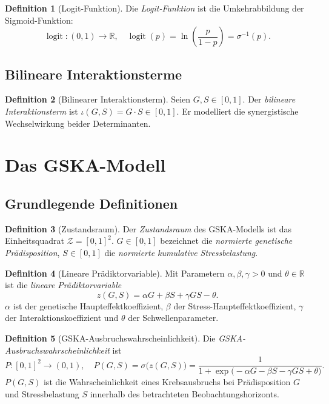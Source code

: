 ﻿\documentclass[12pt, a4paper]{article}
\theoremstyle{definition}
\newtheorem{definition}{Definition}[section]
\theoremstyle{remark}
\DeclareMathOperator{\logit}{logit}
\newcommand{\R}{\mathbb{R}}
\begin{document}
\begin{definition}[Logit-Funktion]
\label{def:logit}
Die \emph{Logit-Funktion} ist die Umkehrabbildung der Sigmoid-Funktion:
\[
  \logit : (0,1) \to \R, \quad \logit(p) = \ln\!\left(\frac{p}{1-p}\right) = \sigma^{-1}(p).
\]
\end{definition}

\subsection{Bilineare Interaktionsterme}

\begin{definition}[Bilinearer Interaktionsterm]
\label{def:bilinear}
Seien $G, S \in [0,1]$. Der \emph{bilineare Interaktionsterm} ist
$\iota(G,S) = G \cdot S \in [0,1]$.
Er modelliert die synergistische Wechselwirkung beider Determinanten.
\end{definition}


\section{Das GSKA-Modell}
\label{sec:modell}


\subsection{Grundlegende Definitionen}

\begin{definition}[Zustandsraum]
\label{def:zustandsraum}
Der \emph{Zustandsraum} des GSKA-Modells ist das Einheitsquadrat
$\mathcal{Z} = [0,1]^2$.
$G \in [0,1]$ bezeichnet die \emph{normierte genetische Prädisposition},
$S \in [0,1]$ die \emph{normierte kumulative Stressbelastung}.
\end{definition}

\begin{definition}[Lineare Prädiktorvariable]
\label{def:praediktor}
Mit Parametern $\alpha, \beta, \gamma > 0$ und $\theta \in \R$ ist die
\emph{lineare Prädiktorvariable}
\[
  z(G,S) = \alpha G + \beta S + \gamma G S - \theta.
\]
$\alpha$ ist der genetische Haupteffektkoeffizient, $\beta$ der
Stress-Haupteffektkoeffizient, $\gamma$ der Interaktionskoeffizient
und $\theta$ der Schwellenparameter.
\end{definition}

\begin{definition}[GSKA-Ausbruchswahrscheinlichkeit]
\label{def:P_GSKA}
Die \emph{GSKA-Ausbruchswahrschein\-lichkeit} ist
\[
  P : [0,1]^2 \to (0,1), \quad P(G,S) = \sigma\!\bigl(z(G,S)\bigr) =
  \frac{1}{1 + \exp\!\bigl(-\alpha G - \beta S - \gamma G S + \theta\bigr)}.
\]
$P(G,S)$ ist die Wahrscheinlichkeit eines Krebsausbruchs bei Prädisposition $G$
und Stressbelastung $S$ innerhalb des betrachteten Beobachtungshorizonts.
\end{definition}
\end{document}
